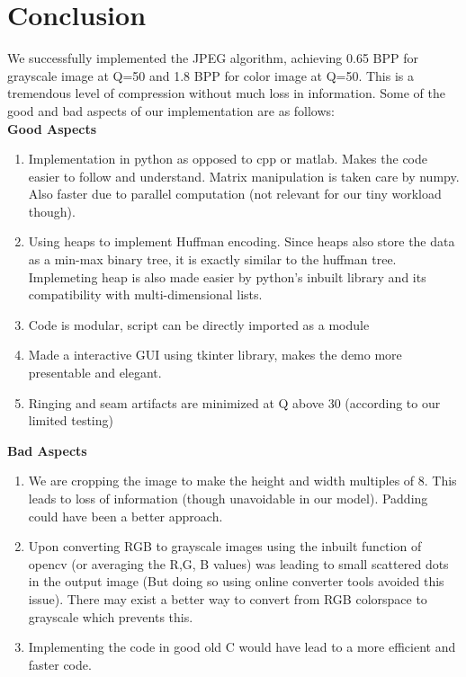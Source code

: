\documentclass[12pt, a4paper]{report}
\begin{document}
	\chapter{Conclusion}
	We successfully implemented the JPEG algorithm, achieving 0.65 BPP for grayscale image at Q=50 and 1.8 BPP for color image at Q=50. This is a tremendous level of compression without much loss in information.
	Some of the good and bad aspects of our implementation are as follows:\\
	\textbf{Good Aspects}
	\begin{enumerate}
		\item Implementation in python as opposed to cpp or matlab. Makes the code easier to follow and understand. Matrix manipulation is taken care by numpy. Also faster due to parallel computation (not relevant for our tiny workload though).
		\item Using heaps to implement Huffman encoding. Since heaps also store the data as a min-max binary tree, it is exactly similar to the huffman tree. Implemeting heap is also made easier by python's inbuilt library and its compatibility with multi-dimensional lists.
		\item Code is modular, script can be directly imported as a module
		\item Made a interactive GUI using tkinter library, makes the demo more presentable and elegant.
		\item Ringing and seam artifacts are minimized at Q above 30 (according to our limited testing)
	\end{enumerate}
	\textbf{Bad Aspects}
	\begin{enumerate}
		\item We are cropping the image to make the height and width multiples of 8. This leads to loss of information (though unavoidable in our model). Padding could have been a better approach.
		\item Upon converting RGB to grayscale images using the inbuilt function of opencv (or averaging the R,G, B values) was leading to small scattered dots in the output image (But doing so using online converter tools avoided this issue). There may exist a better way to convert from RGB colorspace to grayscale which prevents this.
		\item Implementing the code in good old C would have lead to a more efficient and faster code.
	\end{enumerate}
\end{document}
